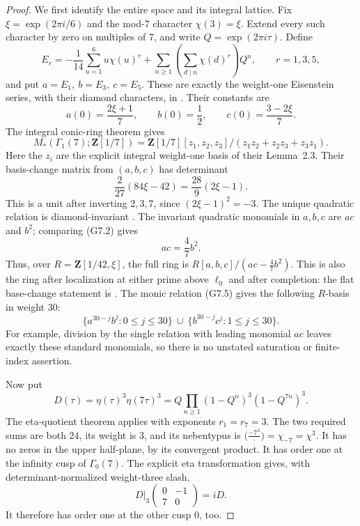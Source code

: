 \documentclass[11pt,a4paper]{article}
\theoremstyle{definition}
\begin{document}
\begin{proof}
We first identify the entire space and its integral lattice.
Fix \(\xi=\exp(2\pi i/6)\) and the mod-\(7\) character
\(\chi(3)=\xi\). Extend every such character by zero on multiples
of \(7\), and write \(Q=\exp(2\pi i\tau)\). Define
\[
 E_r=-\frac1{14}\sum_{u=1}^6u\chi(u)^r
     +\sum_{n\ge1}\left(\sum_{d\mid n}\chi(d)^r\right)Q^n,
 \qquad r=1,3,5,
\]
and put \(a=E_1,\ b=E_3,\ c=E_5\).
These are exactly the weight-one Eisenstein series, with their
diamond characters, in
\cite[\S2, pp.~8--9]{K17MeierOzornova2020}. Their constants are
\[
 a(0)=\frac{2\xi+1}{7},\qquad b(0)=\frac12,\qquad
 c(0)=\frac{3-2\xi}{7}.
 \tag{G7.2}
\]
The integral conic-ring theorem
\cite[Proposition~2.4 and its proof, pp.~10--11]{K17MeierOzornova2020}
gives
\[
 M_*(\Gamma_1(7);\mathbf Z[1/7])
  =\mathbf Z[1/7][z_1,z_2,z_3]/
       (z_1z_2+z_2z_3+z_3z_1).
 \tag{G7.3}
\]
Here the \(z_i\) are the explicit integral weight-one basis of
their Lemma~2.3. Their basis-change matrix from \((a,b,c)\)
has determinant
\[
 \frac2{27}(84\xi-42)=\frac{28}{9}(2\xi-1).
 \tag{G7.4}
\]
This is a unit after inverting \(2,3,7\), since
\((2\xi-1)^2=-3\).
The unique quadratic relation is diamond-invariant
\cite[Lemma~2.6, p.~11]{K17MeierOzornova2020}.
The invariant quadratic monomials in \(a,b,c\) are \(ac\) and
\(b^2\); comparing (G7.2) gives
\[
 ac=\frac47b^2.
 \tag{G7.5}
\]
Thus, over \(R=\mathbf Z[1/42,\xi]\), the full ring is
\(R[a,b,c]/(ac-\tfrac47b^2)\).
This is also the ring after localization at either prime above
\(\ell_0\) and after completion: the flat base-change statement
is \cite[Lemma~2.1, p.~7]{K17MeierOzornova2020}.
The monic relation (G7.5) gives the following \(R\)-basis in
weight \(30\):
\[
 \{a^{30-j}b^j:0\le j\le30\}
 \ \cup\
 \{b^{30-j}c^j:1\le j\le30\}.
 \tag{G7.6}
\]
For example, division by the single relation with leading
monomial \(ac\) leaves exactly these standard monomials, so
there is no unstated saturation or finite-index assertion.

Now put
\[
 D(\tau)=\eta(\tau)^3\eta(7\tau)^3
        =Q\prod_{n\ge1}(1-Q^n)^3(1-Q^{7n})^3.
 \tag{G7.7}
\]
The eta-quotient theorem
\cite[Theorem~1.1 and Remark~1.2, p.~2]{K17SavittNewman}
applies with exponents \(r_1=r_7=3\). The two required sums
are both \(24\), its weight is \(3\), and its nebentypus is
\(\bigl(\frac{-7^3}{\,\cdot\,}\bigr)=\chi_{-7}=\chi^3\).
It has no zeros in the upper half-plane, by its convergent
product. It has order one at the infinity cusp of
\(\Gamma_0(7)\). The explicit eta transformation
\cite[Proposition~3.1 and its proof, p.~4]{K17SavittNewman}
gives, with determinant-normalized weight-three slash,
\[
 D|_3\begin{pmatrix}0&-1\\7&0\end{pmatrix}=iD.
 \tag{G7.8}
\]
It therefore has order one at the other cusp \(0\), too.


\end{proof}
\end{document}
